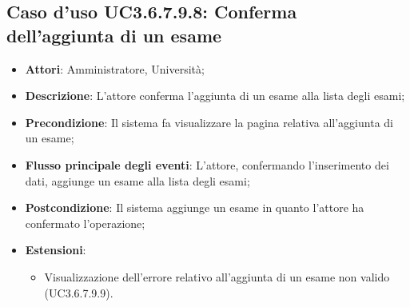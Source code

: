 \subsection{Caso d'uso \texorpdfstring{UC3.6.7.9.8}{UC3.6.7.9.8}: Conferma dell’aggiunta di un esame}
\begin{itemize}
	\item \textbf{Attori}: Amministratore, Università;
	\item \textbf{Descrizione}: L'attore conferma l'aggiunta di un esame alla lista degli esami;
	
	\item \textbf{Precondizione}: Il sistema fa visualizzare la pagina relativa all'aggiunta di un esame;
	
	\item \textbf{Flusso principale degli eventi}: L'attore, confermando l'inserimento dei dati, aggiunge un esame alla lista degli esami;
	
	\item \textbf{Postcondizione}: Il sistema aggiunge un esame in quanto l'attore ha confermato l'operazione;
	
	\item \textbf{Estensioni}:
	\begin{itemize}
		\item Visualizzazione dell'errore relativo all’aggiunta di un esame non valido (UC3.6.7.9.9).
	\end{itemize}
\end{itemize}
